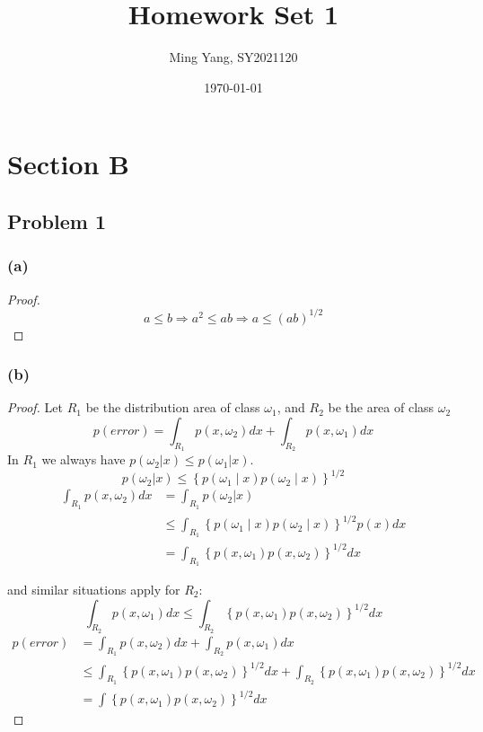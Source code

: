 \documentclass{article}
\title{Homework Set 1}
\author{Ming Yang, SY2021120}
\date\today
\begin{document}
\maketitle

\section*{Section B}
\subsection*{Problem 1}
\subsubsection*{(a)}
\begin{proof}
\[
    a \leq b \Rightarrow a^2 \leq ab \Rightarrow a \leq (ab)^{1/2}
\]
\end{proof}
\subsubsection*{(b)}
\begin{proof}
Let $R_1$ be the distribution area of class $\omega_1$, and $R_2$ be the area of class $\omega_2$
\[
    p(error) = \int_{R_1}p(x, \omega_2)dx + \int_{R_2}p(x, \omega_1)dx
\]
In $R_1$ we always have $p(\omega_2 | x) \leq p(\omega_1 | x)$.
\[
    p(\omega_2 | x) \leq \left\{ p(\omega_1 \mid x)p(\omega_2 \mid x) \right\}^{1/2}
\]
\begin{equation*}
\begin{aligned}
    \int_{R_1}p(x, \omega_2)dx &= \int_{R_1}p(\omega_2 | x) \\
    &\leq \int_{R_1}\left\{ p(\omega_1 \mid x)p(\omega_2 \mid x) \right\}^{1/2}p(x)dx \\
    &= \int_{R_1}\left\{p(x, \omega_1)p(x, \omega_2)\right\}^{1/2}dx
\end{aligned}
\end{equation*}

and similar situations apply for $R_2$:
\[
    \int_{R_2}p(x, \omega_1)dx \leq \int_{R_2}\left\{p(x, \omega_1)p(x, \omega_2)\right\}^{1/2}dx
\]
\begin{equation*}
\begin{aligned}
    p(error) &= \int_{R_1}p(x, \omega_2)dx + \int_{R_2}p(x, \omega_1)dx \\
    &\leq \int_{R_1}\left\{p(x, \omega_1)p(x, \omega_2)\right\}^{1/2}dx + \int_{R_2}\left\{p(x, \omega_1)p(x, \omega_2)\right\}^{1/2}dx \\
    &= \int\left\{p(x, \omega_1)p(x, \omega_2)\right\}^{1/2}dx
\end{aligned}
\end{equation*}
\end{proof}
\end{document}

